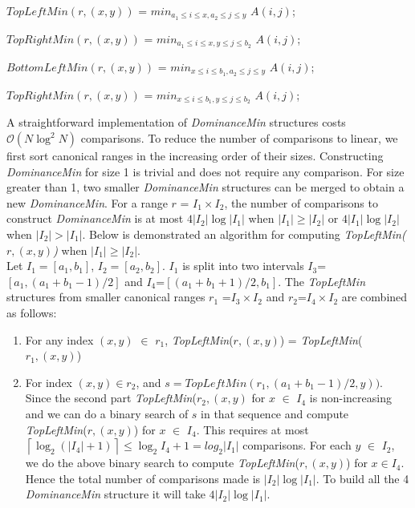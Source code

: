 
\begin{center}
$TopLeftMin(r, (x, y))$ = $min _{a_1 \leq i \leq x, a_2 \leq j \leq y}$ $A(i,j)$; 

$TopRightMin(r, (x, y))$ = $min _{a_1 \leq i \leq x, y \leq j \leq b_2}$ $A(i,j)$; 

$BottomLeftMin(r, (x, y))$ = $min _{x \leq i \leq b_1, a_2 \leq j \leq y}$ $A(i,j)$; 

$TopRightMin(r, (x, y))$ = $min _{x \leq i \leq b_1, y \leq j \leq b_2}$ $A(i,j)$; \\
\end{center}

A straightforward implementation of \emph{DominanceMin} structures costs $\mathcal{O}(N \log^2 N)$ comparisons. To reduce the number of comparisons to linear, we first sort canonical ranges in the increasing order of their sizes. Constructing \emph{DominanceMin} for size 1 is trivial and does not require any comparison. For size greater than 1, two smaller \emph{DominanceMin} structures can be merged to obtain a new \emph{DominanceMin}. For a range $r$ = $I_1 \times I_2$, the number of comparisons to construct \emph{DominanceMin} is at most $4 |I_2| \log |I_1|$ when $|I_1| \geq |I_2|$ or  $4 |I_1| \log |I_2|$ when $|I_2| > |I_1|$. Below is demonstrated an algorithm for computing \emph{TopLeftMin($r,(x,y)$)} when $|I_1| \geq |I_2|$.\\
Let $I_1=[a_1,b_1]$, $I_2=[a_2,b_2]$. $I_1$ is split into two intervals $I_3$=$[a_1, (a_1+b_1-1)/2]$ and $I_4$=$[(a_1+b_1+1)/2,b_1]$. The \emph{TopLeftMin} structures from smaller canonical ranges $r_1$ =$I_3 \times I_2$ and $r_2$=$I_4 \times I_2$ are combined as follows:
\begin{enumerate}
\item For any index $(x,y)$ $\in$ $r_1$, \emph{TopLeftMin}($r, (x, y)$) = \emph{TopLeftMin}($r_1, (x, y)$)
\item For index  $(x,y) \in r_2$, and  $s = TopLeftMin(r_1, (a_1+b_1-1)/2,y))$. Since the second part \emph{TopLeftMin}($r_2, (x, y)$ for $x$ $\in$ $I_4$ is non-increasing and we can do a binary search of $s$ in that sequence and compute \emph{TopLeftMin}($r, (x, y)$) for $x$ $\in$ $I_4$. This requires at most $\left \lceil\log_2 (|I_4|+1) \right \rceil \leq \log_{2}I_4+1=log_2|I_1|$ comparisons. For each $y$ $\in$ $I_2$, we do the above binary search to compute \emph{TopLeftMin}($r, (x, y)$) for $x \in I_4$. Hence the total number of comparisons made is $|I_2| \log |I_1|$. To build all the 4 \emph{DominanceMin} structure it will take $4 |I_2| \log |I_1|$.
\end{enumerate}

